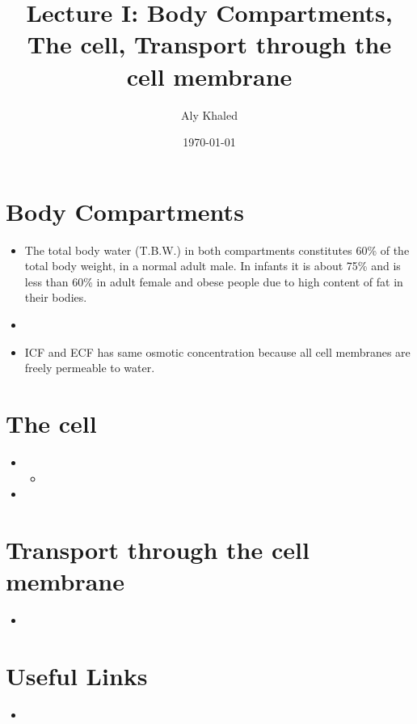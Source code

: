 \documentclass{article}
\title{Lecture I: Body Compartments, The cell, Transport through the cell membrane}
\author{Aly Khaled}
\date{\today}
\begin{document}
 
    \maketitle
    \section{Body Compartments}
    \begin{itemize}
    \item The total body water (T.B.W.) in both compartments constitutes 60\% of the total body weight, in a normal adult male. In infants it is about 75\% and is less than 60\% in adult female
and obese people due to high content of fat in their bodies.
	\item 
	\item ICF and ECF has same osmotic concentration because all cell membranes are freely permeable to water. 
    \end{itemize}
   
    \section{The cell} 
    \begin{itemize}
    	\item 
    	\begin{itemize}
    		\item
    	\end{itemize}
	    \item 
    \end{itemize}
    \section{Transport through the cell membrane} 
    \begin{itemize}
		\item 
    \end{itemize}

	\section*{Useful Links}
    \begin{itemize}
    	\item 
    \end{itemize}
\end{document}
